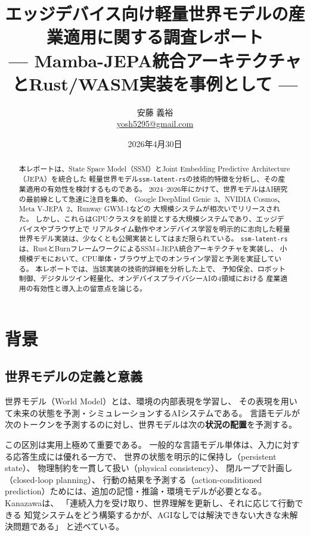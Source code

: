 \documentclass[11pt,a4paper]{ltjsarticle}
\title{
  エッジデバイス向け軽量世界モデルの産業適用に関する調査レポート\\
  {\large --- Mamba-JEPA統合アーキテクチャとRust/WASM実装を事例として ---}
}
\author{
  安藤 義裕\\
  \href{mailto:yosh5295@gmail.com}{yosh5295@gmail.com}
}
\date{2026年4月30日}
\begin{document}
\maketitle

\begin{abstract}
本レポートは、State Space Model（SSM）とJoint Embedding Predictive Architecture（JEPA）を統合した
軽量世界モデル\texttt{ssm-latent-rs}の技術的特徴を分析し、その産業適用の有効性を検討するものである。
2024--2026年にかけて、世界モデルはAI研究の最前線として急速に注目を集め、
Google DeepMind Genie~3、NVIDIA Cosmos、Meta V-JEPA~2、Runway GWM-1などの
大規模システムが相次いでリリースされた。
しかし、これらはGPUクラスタを前提とする大規模システムであり、エッジデバイスやブラウザ上で
リアルタイム動作やオンデバイス学習を明示的に志向した軽量世界モデル実装は、少なくとも公開実装としてはまだ限られている。
\texttt{ssm-latent-rs}は、RustとBurnフレームワークによるSSM+JEPA統合アーキテクチャを実装し、
小規模デモにおいて、CPU単体・ブラウザ上でのオンライン学習と予測を実証している。
本レポートでは、当該実装の技術的詳細を分析した上で、
予知保全、ロボット制御、デジタルツイン軽量化、オンデバイスプライバシーAIの4領域における
産業適用の有効性と導入上の留意点を論じる。
\end{abstract}

\tableofcontents
\newpage

\section{背景}

\subsection{世界モデルの定義と意義}

世界モデル（World Model）とは、環境の内部表現を学習し、
その表現を用いて未来の状態を予測・シミュレーションするAIシステムである\cite{ha2018world}。
言語モデルが次のトークンを予測するのに対し、世界モデルは次の\textbf{状況の配置}を予測する。

この区別は実用上極めて重要である。
一般的な言語モデル単体は、入力に対する応答生成には優れる一方で、
世界の状態を明示的に保持し（persistent state）、
物理制約を一貫して扱い（physical consistency）、
閉ループで計画し（closed-loop planning）、
行動の結果を予測する（action-conditioned prediction）ためには、追加の記憶・推論・環境モデルが必要となる。
Kanazawaは、
「連続入力を受け取り、世界理解を更新し、それに応じて行動できる
知覚システムをどう構築するかが、AGIなしでは解決できない大きな未解決問題である」
と述べている\cite{scientificamerican2026worldmodel}。
\end{document}
